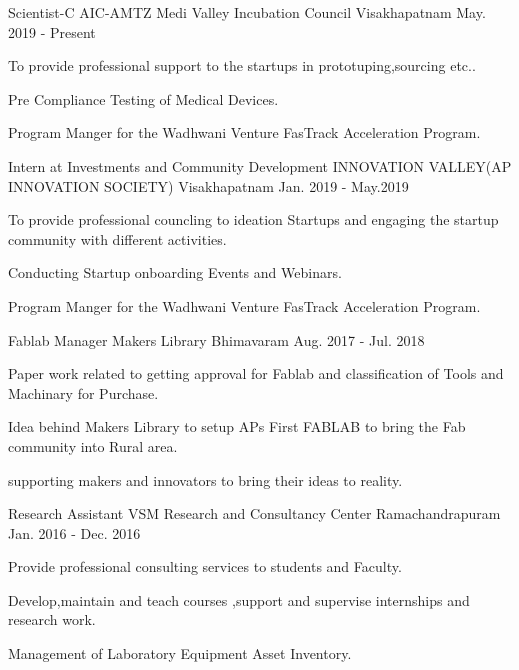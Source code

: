 \begin{cventries}
 \cventry
    {Scientist-C}
    {AIC-AMTZ Medi Valley Incubation Council}
    {Visakhapatnam}
    {May. 2019 - Present}
    {
      \begin{cvitems}
        \item {To provide professional support to the startups in prototuping,sourcing etc..}
        \item {Pre Compliance Testing of Medical Devices.}
        \item {Program Manger for the Wadhwani Venture FasTrack Acceleration Program.}
      \end{cvitems}
    }
  \cventry
    {Intern at Investments and Community Development}
    {INNOVATION VALLEY(AP INNOVATION SOCIETY)}
    {Visakhapatnam}
    {Jan. 2019 - May.2019}
    {
      \begin{cvitems}
        \item {To provide professional councling to ideation Startups and engaging the startup community with different activities.}
        \item {Conducting Startup onboarding Events and Webinars.}
        \item {Program Manger for the Wadhwani Venture FasTrack Acceleration Program.}
      \end{cvitems}
    }
  \cventry
    {Fablab Manager}
    {Makers Library}
    {Bhimavaram}
    {Aug. 2017 - Jul. 2018}
    {
      \begin{cvitems}
        \item {Paper work related to getting approval for Fablab and classification of Tools and Machinary for Purchase.}
	\item{Idea behind Makers Library to setup APs First FABLAB to bring the Fab community into Rural area.}
        \item {supporting makers and innovators to bring their ideas to reality.}
      \end{cvitems}
    }
  \cventry
    {Research Assistant}
    {VSM Research and Consultancy Center}
    {Ramachandrapuram}
    {Jan. 2016 - Dec. 2016}
    {
      \begin{cvitems}
        \item {Provide professional consulting services to students and Faculty.}
	\item{Develop,maintain and teach courses ,support and supervise internships and research work.}
        \item {Management of Laboratory Equipment Asset Inventory.}

\end{cvitems}}
\end{cventries}
